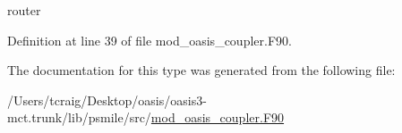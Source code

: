 router 



Definition at line 39 of file mod\+\_\+oasis\+\_\+coupler.\+F90.



The documentation for this type was generated from the following file\+:\begin{DoxyCompactItemize}
\item 
/\+Users/tcraig/\+Desktop/oasis/oasis3-\/mct.\+trunk/lib/psmile/src/\hyperlink{mod__oasis__coupler_8_f90}{mod\+\_\+oasis\+\_\+coupler.\+F90}\end{DoxyCompactItemize}
